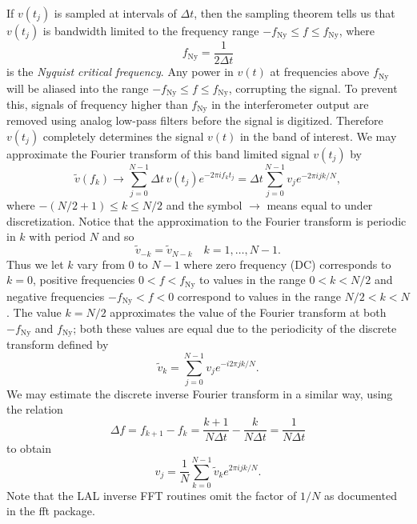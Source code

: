 If $v(t_j)$ is sampled at intervals of $\Delta t$, then the sampling theorem
tells us that $v(t_j)$ is bandwidth limited to the frequency range
$-f_\mathrm{Ny} \le f \le f_\mathrm{Ny}$, where
\begin{equation}
f_\mathrm{Ny} = \frac{1}{2\Delta t}
\end{equation}
is the \emph{Nyquist critical frequency}. Any power in $v(t)$ at frequencies
above $f_\mathrm{Ny}$ will be aliased into the range $-f_\mathrm{Ny} \le f
\le f_\mathrm{Ny}$, corrupting the signal. To prevent this, signals of
frequency higher than $f_\mathrm{Ny}$ in the interferometer output are removed
using analog low-pass filters before the signal is digitized. Therefore
$v(t_j)$ completely determines the signal $v(t)$ in the band of interest. We
may approximate the Fourier transform of this band limited signal $v(t_j)$ by
\begin{equation}
\tilde{v}(f_k) \rightarrow \sum_{j=0}^{N-1} \Delta t\, v(t_j) e^{-2 \pi i f_k t_j}
= \Delta t \sum_{j=0}^{N-1} v_j e^{-2 \pi i j k / N},
\label{eq:fftapprox}
\end{equation}
where $-(N/2 + 1) \le k \le N/2$ and the symbol $\rightarrow$ means
equal to under discretization.  Notice that the approximation to the
Fourier transform is periodic in $k$ with period $N$ and so 
\begin{equation}
\tilde{v}_{-k} = \tilde{v}_{N-k}\quad k = 1, \ldots, N - 1.
\end{equation}
Thus we let $k$ vary from $0$ to $N-1$ where zero frequency (DC) corresponds
to $k=0$, positive frequencies $0 < f < f_\mathrm{Ny}$ to values in the range
$0 < k < N/2$ and negative frequencies $-f_\mathrm{Ny} < f < 0$ correspond
to values in the range $N/2 < k < N$. The value $k = N/2$ approximates the
value of the Fourier transform at both $-f_\mathrm{Ny}$ and $f_\mathrm{Ny}$;
both these values are equal due to the periodicity of the discrete transform 
defined by
\begin{equation}
\tilde{v}_k = \sum_{j=0}^{N-1} v_j e^{-i 2 \pi j k / N}.
\label{eq:dftdef}
\end{equation}
We may estimate the discrete inverse Fourier transform
in a similar way, using the relation
\begin{equation}
\Delta f = f_{k+1} - f_k = \frac{k+1}{N\Delta t} - \frac{k}{N\Delta t} =
\frac{1}{N\Delta t}
\end{equation}
to obtain
\begin{equation}
v_j = \frac{1}{N} \sum_{k=0}^{N-1} \tilde{v}_k e^{2 \pi i j k / N}.
\end{equation}
Note that the LAL inverse FFT routines omit the factor of $1/N$ as documented
in the fft package.


